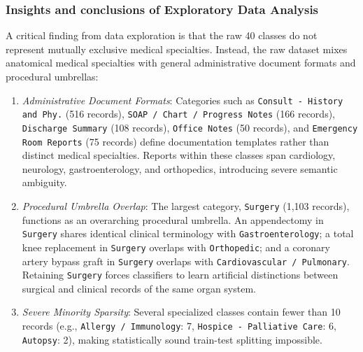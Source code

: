 \subsubsection{Insights and conclusions of Exploratory Data Analysis}
A critical finding from data exploration is that the raw 40 classes do not represent mutually exclusive medical specialties. Instead, the raw dataset mixes anatomical medical specialties with general administrative document formats and procedural umbrellas:
\begin{enumerate}
    \item \textit{Administrative Document Formats}: Categories such as \texttt{Consult - History and Phy.} (516 records), \texttt{SOAP\,/\allowbreak\,Chart\,/\allowbreak\,Progress Notes} (166 records), \texttt{Discharge Summary} (108 records), \texttt{Office Notes} (50 records), and \texttt{Emergency Room Reports} (75 records) define documentation templates rather than distinct medical specialties. Reports within these classes span cardiology, neurology, gastroenterology, and orthopedics, introducing severe semantic ambiguity.
    \item \textit{Procedural Umbrella Overlap}: The largest category, \texttt{Surgery} (1,103 records), functions as an overarching procedural umbrella. An appendectomy in \texttt{Surgery} shares identical clinical terminology with \texttt{Gastroenterology}; a total knee replacement in \texttt{Surgery} overlaps with \texttt{Orthopedic}; and a coronary artery bypass graft in \texttt{Surgery} overlaps with \texttt{Cardiovascular\,/\allowbreak\,Pulmonary}. Retaining \texttt{Surgery} forces classifiers to learn artificial distinctions between surgical and clinical records of the same organ system.
    \item \textit{Severe Minority Sparsity}: Several specialized classes contain fewer than 10 records (e.g., \texttt{Allergy / Immunology}: 7, \texttt{Hospice - Palliative Care}: 6, \texttt{Autopsy}: 2), making statistically sound train-test splitting impossible.
\end{enumerate}

